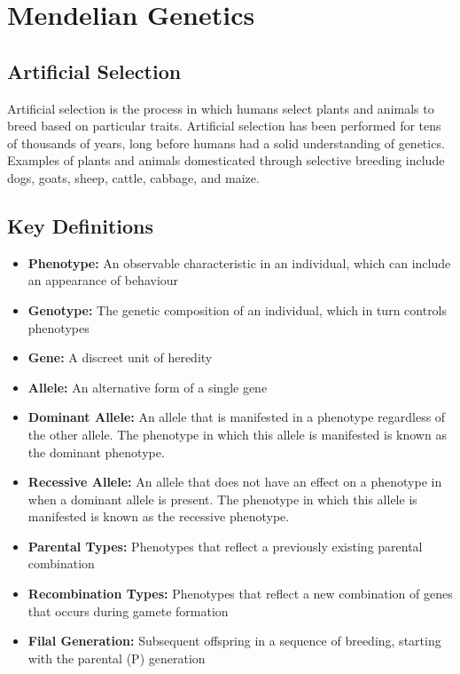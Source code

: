 \documentclass[12pt,titlepage]{article}
\begin{document}
    \section{Mendelian Genetics}
      \subsection{Artificial Selection}
        Artificial selection is the process in which humans select plants and animals to breed based 
        on particular traits. Artificial selection has been performed for tens of thousands of years,
        long before humans had a solid understanding of genetics. Examples of plants and animals domesticated
        through selective breeding include dogs, goats, sheep, cattle, cabbage, and maize.

      \subsection{Key Definitions}
        \begin{itemize}
          \item \textbf{Phenotype:} An observable characteristic in an individual, which can include an appearance of behaviour
          \item \textbf{Genotype:} The genetic composition of an individual, which in turn controls phenotypes
          \item \textbf{Gene:} A discreet unit of heredity
          \item \textbf{Allele:} An alternative form of a single gene
          \item \textbf{Dominant Allele:} An allele that is manifested in a phenotype regardless of the other allele.
          The phenotype in which this allele is manifested is known as the dominant phenotype.
          \item \textbf{Recessive Allele:} An allele that does not have an effect on a phenotype in when a dominant allele is present.
          The phenotype in which this allele is manifested is known as the recessive phenotype.
          \item \textbf{Parental Types:} Phenotypes that reflect a previously existing parental combination
          \item \textbf{Recombination Types:} Phenotypes that reflect a new combination of genes that occurs during gamete formation
          \item \textbf{Filal Generation:} Subsequent offspring in a sequence of breeding, starting with the parental (P) generation
        \end{itemize}
\end{document}
